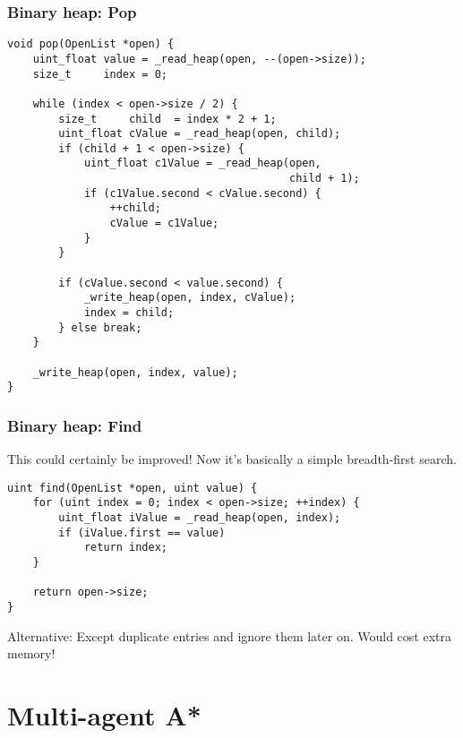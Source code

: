 \documentclass{beamer}
\begin{document}
\begin{frame}[fragile]
    \frametitle{Binary heap: Pop}
    \begin{lstlisting}
void pop(OpenList *open) {
    uint_float value = _read_heap(open, --(open->size));
    size_t     index = 0;

    while (index < open->size / 2) {
        size_t     child  = index * 2 + 1;
        uint_float cValue = _read_heap(open, child);
        if (child + 1 < open->size) {
            uint_float c1Value = _read_heap(open,
                                            child + 1);
            if (c1Value.second < cValue.second) {
                ++child;
                cValue = c1Value;
            }
        }

        if (cValue.second < value.second) {
            _write_heap(open, index, cValue);
            index = child;
        } else break;
    }

    _write_heap(open, index, value);
}
    \end{lstlisting}
\end{frame}

\begin{frame}[fragile]
    \frametitle{Binary heap: Find}
    This could certainly be improved! Now it's basically a simple breadth-first search.
    
    \begin{lstlisting}
uint find(OpenList *open, uint value) {
    for (uint index = 0; index < open->size; ++index) {
        uint_float iValue = _read_heap(open, index);
        if (iValue.first == value)
            return index;
    }

    return open->size;
}
    \end{lstlisting}
    
    Alternative: Except duplicate entries and ignore them later on. Would cost extra memory!
\end{frame}

\section{Multi-agent A*}
\end{document}
